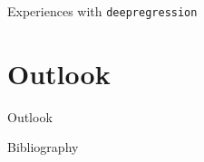 \documentclass[xcolor=dvipsnames]{beamer}
\begin{document}
\begin{frame}
\end{frame}

\begin{frame}
\end{frame}

\begin{frame}{Experiences with \texttt{deepregression}}
\end{frame}

\section{Outlook}
\begin{frame}{Outlook}
\end{frame}

\begin{frame}[allowframebreaks]{Bibliography}
  \printbibliography[heading=bibnumbered, title = Bibliography]
\end{frame}
\end{document}

